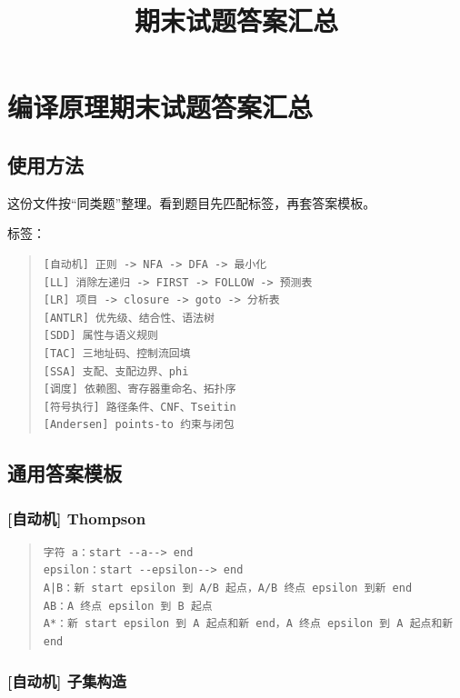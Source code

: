 \documentclass[UTF8,zihao=-4]{ctexart}
\title{期末试题答案汇总}
\author{}
\date{}
\begin{document}
\maketitle
\setcounter{tocdepth}{1}
\tableofcontents
\newpage
\section{编译原理期末试题答案汇总}


\subsection{使用方法}


这份文件按“同类题”整理。看到题目先匹配标签，再套答案模板。


标签：


\begin{quote}
\footnotesize
\begin{verbatim}
[自动机] 正则 -> NFA -> DFA -> 最小化
[LL] 消除左递归 -> FIRST -> FOLLOW -> 预测表
[LR] 项目 -> closure -> goto -> 分析表
[ANTLR] 优先级、结合性、语法树
[SDD] 属性与语义规则
[TAC] 三地址码、控制流回填
[SSA] 支配、支配边界、phi
[调度] 依赖图、寄存器重命名、拓扑序
[符号执行] 路径条件、CNF、Tseitin
[Andersen] points-to 约束与闭包
\end{verbatim}
\end{quote}


\subsection{通用答案模板}


\subsubsection{[自动机] Thompson}


\begin{quote}
\footnotesize
\begin{verbatim}
字符 a：start --a--> end
epsilon：start --epsilon--> end
A|B：新 start epsilon 到 A/B 起点，A/B 终点 epsilon 到新 end
AB：A 终点 epsilon 到 B 起点
A*：新 start epsilon 到 A 起点和新 end，A 终点 epsilon 到 A 起点和新 end
\end{verbatim}
\end{quote}


\subsubsection{[自动机] 子集构造}
\end{document}
